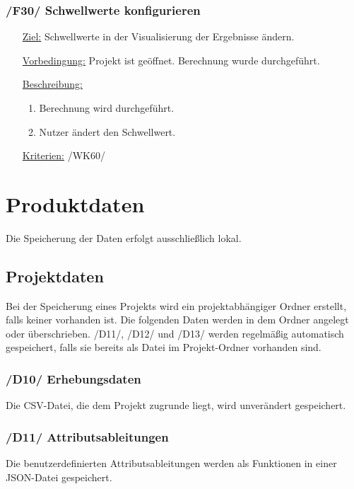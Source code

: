 \documentclass{article}
\begin{document}
\subsubsection*{\textbf{/F30/} Schwellwerte konfigurieren} \label{sec:f:Schwellwerte konfigurieren}
\begin{itemize}
    \item[\underline{Ziel:}] Schwellwerte in der Visualisierung der Ergebnisse ändern.
    \item[\underline{Vorbedingung:}] Projekt ist geöffnet. Berechnung wurde durchgeführt.
    \item[\underline{Beschreibung:}]
    \begin{enumerate}
        \item Berechnung wird durchgeführt.
        \item Nutzer ändert den Schwellwert.
    \end{enumerate}
    \item[\underline{Kriterien:}] /WK60/
\end{itemize}

\clearpage
\section{Produktdaten}
Die Speicherung der Daten erfolgt ausschließlich lokal.
\subsection{Projektdaten}
Bei der Speicherung eines Projekts wird ein projektabhängiger Ordner erstellt, falls keiner vorhanden ist. Die folgenden Daten werden in dem Ordner angelegt oder überschrieben. \newline
/D11/, /D12/ und /D13/ werden regelmäßig automatisch gespeichert, falls sie bereits als Datei im Projekt-Ordner vorhanden sind.
\subsubsection*{\textbf{/D10/} Erhebungsdaten} \label{sec:dd:Erhebungsdaten}
Die CSV-Datei, die dem Projekt zugrunde liegt, wird unverändert gespeichert.
\subsubsection*{\textbf{/D11/} Attributsableitungen} \label{sec:dd:Attributsableitungen}
Die benutzerdefinierten Attributsableitungen werden als Funktionen in einer JSON-Datei gespeichert.
\end{document}
